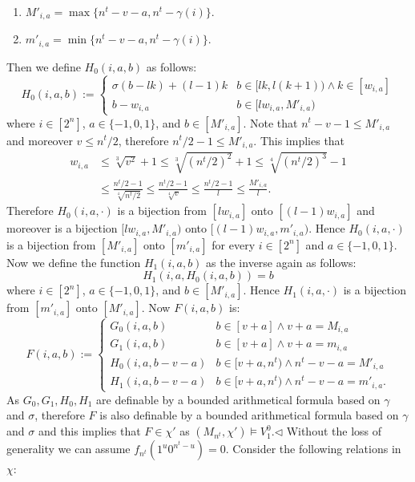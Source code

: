 \begin{enumerate}
\item $M'_{i,a}=\max\{n^t-v-a,n^t-\gamma(i)\}$.
\item $m'_{i,a}=\min\{n^t-v-a,n^t-\gamma(i)\}$.
\end{enumerate}
Then we define $H_0(i,a,b)$ as follows:
\[H_0(i,a,b):=\begin{cases}\sigma(b-lk)+(l-1)k&b\in[lk,l(k+1))\wedge k\in[w_{i,a}]\\b-w_{i,a}&b\in[lw_{i,a},M'_{i,a})\end{cases}\]
where $i\in[2^n]$, $a\in\{-1,0,1\}$, and $b\in[M'_{i,a}]$.
Note that $n^t-v-1\leq M'_{i,a}$ and moreover $v\leq n^t/2$, therefore $n^t/2-1\leq M'_{i,a}$. This implies that
\begin{align*}
w_{i,a}&\leq\sqrt[3]{v^2}+1\leq\sqrt[3]{(n^t/2)^2}+1\leq\sqrt[4]{(n^t/2)^3}-1\\
&\leq\frac{n^t/2-1}{\sqrt[4]{n^t/2}}\leq\frac{n^t/2-1}{\sqrt[4]v}\leq\frac{n^t/2-1}l\leq\frac{M'_{i,a}}l.
\end{align*}
Therefore $H_0(i,a,\cdot)$ is a bijection from $[lw_{i,a}]$ onto $[(l-1)w_{i,a}]$ and moreover is a bijection $[lw_{i,a},M'_{i,a})$ onto $[(l-1)w_{i,a},m'_{i,a})$. Hence $H_0(i,a,\cdot)$ is a bijection from $[M'_{i,a}]$ onto $[m'_{i,a}]$ for every $i\in[2^n]$ and $a\in\{-1,0,1\}$. Now we define the function $H_1(i,a,b)$ as the inverse again as follows:
\[H_1(i,a,H_0(i,a,b))=b\]
where $i\in[2^n]$, $a\in\{-1,0,1\}$, and $b\in[M'_{i,a}]$. Hence $H_1(i,a,\cdot)$ is a bijection from $[m'_{i,a}]$ onto $[M'_{i,a}]$.
Now $F(i,a,b)$ is:
\[F(i,a,b):=\begin{cases}G_0(i,a,b)&b\in[v+a]\wedge v+a=M_{i,a}\\G_1(i,a,b)&b\in[v+a]\wedge v+a=m_{i,a}\\H_0(i,a,b-v-a)&b\in[v+a,n^t)\wedge n^t-v-a=M'_{i,a}\\H_1(i,a,b-v-a)&b\in[v+a,n^t)\wedge n^t-v-a=m'_{i,a}.\end{cases}\]
As $G_0,G_1,H_0,H_1$ are definable by a bounded arithmetical formula based on $\gamma$ and $\sigma$, therefore $F$ is also definable by a bounded arithmetical formula based on $\gamma$ and $\sigma$ and this implies that $F\in\chi'$ as $(M_{n^t},\chi')\models V_1^0$.\hfill$\triangleleft$
Without the loss of generality we can assume $f_{n^t}(1^u0^{n^t-u})=0$. Consider the following relations in $\chi$:
